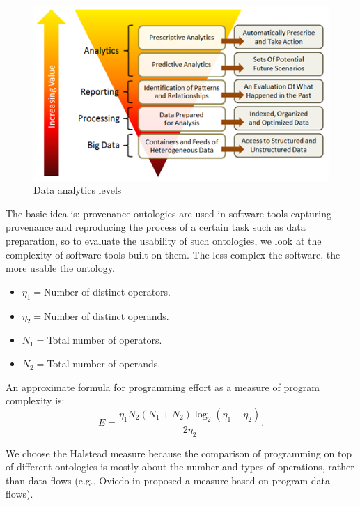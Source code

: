\begin{figure}
	\centering
	\includegraphics[width=\linewidth]{data-analytics.png}
	\caption{Data analytics levels}
	\label{fig:data-analytics}
\end{figure}

The basic idea is: provenance ontologies are used in software tools capturing provenance and reproducing the process of a certain task such as data preparation, so to evaluate the usability of such ontologies, we look at the complexity of software tools built on them. The less complex the software, the more usable the ontology.

\begin{itemize}
\item $\eta_1 = $Number of distinct operators.
\item $\eta_2 = $Number of distinct operands.
\item $N_1 = $Total number of operators.
\item $N_2 = $Total number of operands.
\end{itemize}
An approximate formula for programming effort as a measure of program complexity is:
\begin{equation}
E = \frac{\eta_1N_2(N_1+N_2)\log_2(\eta_1+\eta_2)}{2\eta_2}.
\end{equation}

We choose the Halstead measure because the comparison of programming on top of different ontologies is mostly about the number and types of operations, rather than data flows (e.g., Oviedo in \cite{oviedo1993control} proposed a measure based on program data flows).

